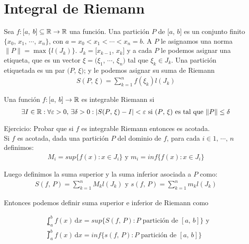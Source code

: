 \section{Integral de Riemann}

Sea $f: [a$, $b] \subseteq \mathbb{R} \to \mathbb{R}$ una función.
Una partición $P$ de $[a$, $b]$ es un conjunto finito \\ $\{ x_0$, $x_1$, $\cdots$, $x_n \}$, con
$a = x_0 < x_1 < \cdots < x_n = b$. A $P$ le asignamos una norma $\| P \| = \max \{ l(J_k) \}$. $J_k = [x_{k-1}$, $x_k]$ y a cada $P$ le
podemos asignar una etiqueta, que es un vector $\xi = (\xi_1$, $\cdots$, $\xi_n)$ tal que $\xi_k \in J_k$. Una partición etiquetada es un par
$(P$, $\xi)$; y le podemos asignar su suma de Riemann \begin{align*}S(P\text{, } \xi) = \sum_{k=1}^{n} f(\xi_k) l(J_k)\end{align*}

\begin{definition}
    Una función $f: [a$, $b] \to \mathbb{R}$ es integrable Riemann si
    \begin{align*}
        \exists I \in \mathbb{R} : \forall \varepsilon > 0\text{, }\exists \delta > 0 : | S(P\text{, } \xi) - I | < \varepsilon \text{ si } (P\text{, } \xi) \text{ es tal que } \| P \| \leq \delta
    \end{align*}
\end{definition}

Ejercicio: Probar que si $f$ es integrable Riemann entonces es acotada. \\

Si $f$ es acotada, dada una partición $P$ del dominio de $f$, para cada $i \in 1 \text{, } \cdots \text{, } n$ definimos:
\begin{align*}
    M_i = sup \{ f(x) : x \in J_i \} \text{ y } m_i = inf\{ f(x) : x \in J_i \}
\end{align*}

Luego definimos la suma superior y la suma inferior asociada a $P$ como:
\begin{align*}
    S(f\text{, } P) = \sum_{k=1}^{n} M_k l(J_k) \text{ y } s(f\text{, } P) = \sum_{k=1}^{n} m_k l(J_k)
\end{align*}

Entonces podemos definir suma superior e inferior de Riemann como

\begin{align*}
     & \lowint_a^b f(x) \, \mathrm{d}x = sup \{ S(f\text{, } P) : P \text{ partición de } [a\text{, } b] \} \text{ y } \\
     & \upint_a^b f(x) \, \mathrm{d}x = inf \{ s(f\text{, } P) : P \text{ partición de } [a\text{, } b] \}
\end{align*}



